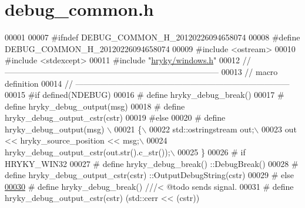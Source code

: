 \hypertarget{debug__common_8h_source}{\section{debug\-\_\-common.\-h}
}

\begin{DoxyCode}
00001 
00007 \textcolor{preprocessor}{#ifndef DEBUG\_COMMON\_H\_20120226094658074}
00008 \textcolor{preprocessor}{}\textcolor{preprocessor}{#define DEBUG\_COMMON\_H\_20120226094658074}
00009 \textcolor{preprocessor}{}\textcolor{preprocessor}{#include <ostream>}
00010 \textcolor{preprocessor}{#include <stdexcept>}
00011 \textcolor{preprocessor}{#include "\hyperlink{windows_8h}{hryky/windows.h}"}
00012 \textcolor{comment}{//
      ------------------------------------------------------------------------------}
00013 \textcolor{comment}{// macro definition}
00014 \textcolor{comment}{//
      ------------------------------------------------------------------------------}
00015 \textcolor{preprocessor}{#if defined(NDEBUG)}
00016 \textcolor{preprocessor}{}\textcolor{preprocessor}{#   define hryky\_debug\_break()}
00017 \textcolor{preprocessor}{}\textcolor{preprocessor}{#   define hryky\_debug\_output(msg)}
00018 \textcolor{preprocessor}{}\textcolor{preprocessor}{#   define hryky\_debug\_output\_cstr(cstr)}
00019 \textcolor{preprocessor}{}\textcolor{preprocessor}{#else}
00020 \textcolor{preprocessor}{}\textcolor{preprocessor}{#   define hryky\_debug\_output(msg) \(\backslash\)}
00021 \textcolor{preprocessor}{\{\(\backslash\)}
00022 \textcolor{preprocessor}{    std::ostringstream out;\(\backslash\)}
00023 \textcolor{preprocessor}{    out << hryky\_source\_position << msg;\(\backslash\)}
00024 \textcolor{preprocessor}{    hryky\_debug\_output\_cstr(out.str().c\_str());\(\backslash\)}
00025 \textcolor{preprocessor}{\}}
00026 \textcolor{preprocessor}{}\textcolor{preprocessor}{#   if HRYKY\_WIN32}
00027 \textcolor{preprocessor}{}\textcolor{preprocessor}{#       define hryky\_debug\_break()              ::DebugBreak()}
00028 \textcolor{preprocessor}{}\textcolor{preprocessor}{#       define hryky\_debug\_output\_cstr(cstr)    ::OutputDebugString(cstr)}
00029 \textcolor{preprocessor}{}\textcolor{preprocessor}{#   else}
\hypertarget{debug__common_8h_source_l00030}{}\hyperlink{debug__common_8h_a6479e85bbd44c48e39bdfb32d243fbcc}{00030} \textcolor{preprocessor}{}\textcolor{preprocessor}{#       define hryky\_debug\_break()              ///< @todo sends signal.}
00031 \textcolor{preprocessor}{}\textcolor{preprocessor}{#       define hryky\_debug\_output\_cstr(cstr)    (std::cerr << (cstr))}

\end{DoxyCode}
